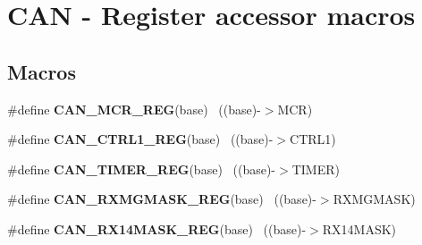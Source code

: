 \hypertarget{group___c_a_n___register___accessor___macros}{}\section{C\+A\+N -\/ Register accessor macros}
\label{group___c_a_n___register___accessor___macros}
\subsection*{Macros}
\begin{DoxyCompactItemize}
\item 
\hypertarget{group___c_a_n___register___accessor___macros_ga266f3270836a0e2113e665b27e8469c3}{}\#define {\bfseries C\+A\+N\+\_\+\+M\+C\+R\+\_\+\+R\+E\+G}(base)                                            ~((base)-\/$>$M\+C\+R)\label{group___c_a_n___register___accessor___macros_ga266f3270836a0e2113e665b27e8469c3}

\item 
\hypertarget{group___c_a_n___register___accessor___macros_gacb8258cf058657f2e55abcfb40b99344}{}\#define {\bfseries C\+A\+N\+\_\+\+C\+T\+R\+L1\+\_\+\+R\+E\+G}(base)                                        ~((base)-\/$>$C\+T\+R\+L1)\label{group___c_a_n___register___accessor___macros_gacb8258cf058657f2e55abcfb40b99344}

\item 
\hypertarget{group___c_a_n___register___accessor___macros_ga1fed1cd31d16a8d3472d1f4f424b4fc8}{}\#define {\bfseries C\+A\+N\+\_\+\+T\+I\+M\+E\+R\+\_\+\+R\+E\+G}(base)                                        ~((base)-\/$>$T\+I\+M\+E\+R)\label{group___c_a_n___register___accessor___macros_ga1fed1cd31d16a8d3472d1f4f424b4fc8}

\item 
\hypertarget{group___c_a_n___register___accessor___macros_gadda1f2634abb5b3f2d33cd29632be22e}{}\#define {\bfseries C\+A\+N\+\_\+\+R\+X\+M\+G\+M\+A\+S\+K\+\_\+\+R\+E\+G}(base)                                  ~((base)-\/$>$R\+X\+M\+G\+M\+A\+S\+K)\label{group___c_a_n___register___accessor___macros_gadda1f2634abb5b3f2d33cd29632be22e}

\item 
\hypertarget{group___c_a_n___register___accessor___macros_gaf9d566ee0a69baad94e2c8c8ae19b832}{}\#define {\bfseries C\+A\+N\+\_\+\+R\+X14\+M\+A\+S\+K\+\_\+\+R\+E\+G}(base)                                  ~((base)-\/$>$R\+X14\+M\+A\+S\+K)\label{group___c_a_n___register___accessor___macros_gaf9d566ee0a69baad94e2c8c8ae19b832}


\end{DoxyCompactItemize}
